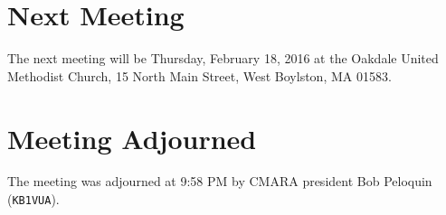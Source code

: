 \documentclass[10pt,letterpaper]{article}
\begin{document}
\section{Next Meeting}

The next meeting will be Thursday, February 18, 2016 at the Oakdale United Methodist Church, 15 North Main Street, West Boylston, MA 01583.\\

\section{Meeting Adjourned}
The meeting was adjourned at 9:58 PM by CMARA president Bob Peloquin (\texttt{KB1VUA}).
\end{document}
